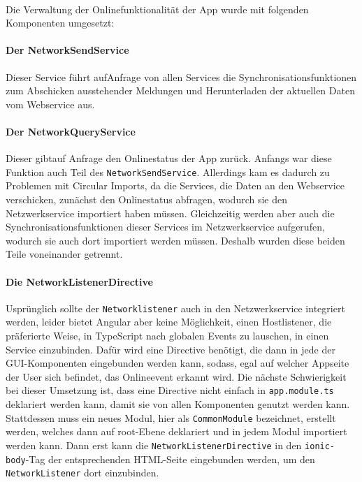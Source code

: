 \documentclass[12pt]{article}
\begin{document}
\paragraph{}
Die Verwaltung der Onlinefunktionalität der App wurde mit folgenden Komponenten umgesetzt: 
\paragraph{Der NetworkSendService} Dieser Service führt aufAnfrage von allen Services die Synchronisationsfunktionen zum Abschicken ausstehender Meldungen und Herunterladen der aktuellen Daten vom Webservice aus.
\paragraph{Der NetworkQueryService} Dieser gibtauf Anfrage den Onlinestatus der App zurück. Anfangs war diese Funktion auch Teil des \texttt{NetworkSendService}. Allerdings kam es dadurch zu Problemen mit Circular Imports, da die Services, die Daten an den Webservice verschicken, zunächst den Onlinestatus abfragen, wodurch sie den Netzwerkservice importiert haben müssen. Gleichzeitig werden aber auch die Synchronisationsfunktionen dieser Services im Netzwerkservice aufgerufen, wodurch sie auch dort importiert werden müssen. Deshalb wurden diese beiden Teile voneinander getrennt.
\paragraph{Die NetworkListenerDirective} Usprünglich sollte der \texttt{Networklistener} auch in den Netzwerkservice integriert werden, leider bietet Angular aber keine Möglichkeit, einen Hostlistener, die präferierte Weise, in TypeScript nach globalen Events zu lauschen, in einen Service einzubinden. Dafür wird eine Directive benötigt, die dann in jede der GUI-Komponenten eingebunden werden kann, sodass, egal auf welcher Appseite der User sich befindet, das Onlineevent erkannt wird. Die nächste Schwierigkeit bei dieser Umsetzung ist, dass eine Directive nicht einfach in \texttt{app.module.ts} deklariert werden kann, damit sie von allen Komponenten genutzt werden kann. Stattdessen muss ein neues Modul, hier als \texttt{CommonModule} bezeichnet, erstellt werden, welches dann auf root-Ebene deklariert und in jedem Modul importiert werden kann. Dann erst kann die \texttt{NetworkListenerDirective} in den \texttt{ionic-body}-Tag der entsprechenden HTML-Seite eingebunden werden, um den \texttt{NetworkListener} dort einzubinden.
\end{document}
